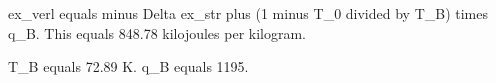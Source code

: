 ex_verl equals minus Delta ex_str plus (1 minus T_0 divided by T_B) times q_B.  
This equals 848.78 kilojoules per kilogram.  

T_B equals 72.89 K.  
q_B equals 1195.